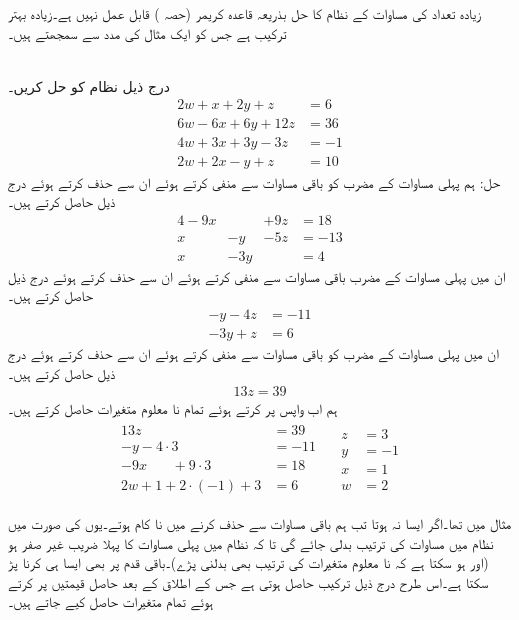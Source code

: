 زیادہ تعداد کی مساوات کے نظام کا حل بذریعہ قاعدہ کریمر (حصہ )  قابل عمل نہیں ہے۔زیادہ بہتر ترکیب  ہے جس کو ایک مثال کی مدد سے سمجھتے ہیں۔

\quad {}\\
درج ذیل نظام کو حل کریں۔
\begin{align*}
2w+x+2y+z&=6\\
6w-6x+6y+12z&=36\\
4w+3x+3y-3z&=-1\\
2w+2x-y+z&=10
\end{align*}
حل:\quad
{} ہم پہلی مساوات کے  مضرب  کو باقی مساوات سے منفی کرتے ہوئے ان سے  حذف کرتے ہوئے درج ذیل حاصل کرتے ہیں۔
\begin{alignat*}{4}
-9x&{}&+9z&=18\\
x&-y&-5z&=-13\\
x&-3y&{}&=4
\end{alignat*}
 ان میں پہلی مساوات کے مضرب باقی مساوات سے منفی کرتے ہوئے ان سے  حذف کرتے ہوئے درج ذیل حاصل کرتے ہیں۔
\begin{align*}
-y-4z&=-11\\
-3y+z&=6
\end{align*}
 ان میں پہلی مساوات کے مضرب کو باقی مساوات سے منفی کرتے ہوئے ان سے  حذف کرتے ہوئے درج ذیل حاصل کرتے ہیں۔
\begin{align*}
13z=39
\end{align*}
 ہم اب واپس پر کرتے ہوئے تمام نا معلوم متغیرات حاصل کرتے ہیں۔
\begin{gather}
\begin{aligned}
13z&=39\\
-y-4\cdot3&=-11\\
-9x\phantom{+4y}+9\cdot 3&=18\\
2w+1+2\cdot(-1)+3&=6
\end{aligned}
\quad 
\begin{aligned}
z&=3\\
y&=-1\\
x&=1\\
w&=2
\end{aligned}
\end{gather} 

مثال  میں  تھا۔اگر ایسا نہ ہوتا تب ہم باقی مساوات سے  حذف کرنے میں نا کام ہوتے۔یوں  کی صورت میں نظام میں مساوات کی ترتیب بدلی جائے گی  تا کہ نظام میں پہلی مساوات کا پہلا  ضریب  غیر صفر ہو (اور ہو سکتا ہے کہ نا معلوم متغیرات کی ترتیب بھی بدلنی پڑے)۔باقی قدم پر بھی ایسا ہی کرنا پڑ سکتا ہے۔اس طرح درج ذیل ترکیب حاصل ہوتی ہے جس کے اطلاق کے بعد حاصل قیمتیں پر کرتے ہوئے تمام متغیرات حاصل کیے جاتے ہیں۔



